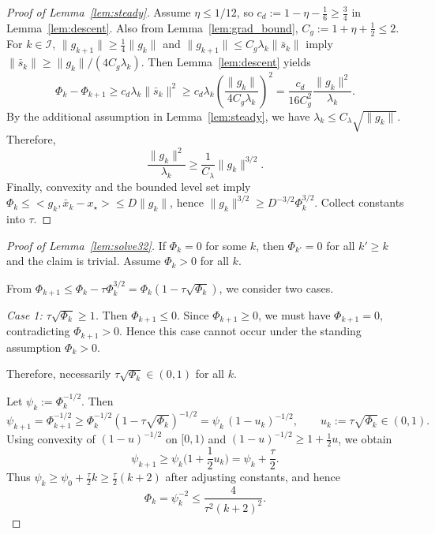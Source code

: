 \documentclass[11pt,a4paper]{article}
\def\ip#1#2{<#1,#2>}%
\newcommand{\ip}[2]{\left\langle #1,#2\right\rangle}
\begin{document}
\begin{proof}[Proof of Lemma~\ref{lem:steady}]
Assume $\eta\le 1/12$, so $c_d:=1-\eta-\frac16\ge \frac34$ in Lemma~\ref{lem:descent}.
Also from Lemma~\ref{lem:grad_bound}, $C_g:=1+\eta+\frac12\le 2$.
For $k\in\mathcal I$, $\|g_{k+1}\|\ge \frac14\|g_k\|$ and $\|g_{k+1}\|\le C_g\lambda_k\|\bar s_k\|$ imply
$\|\bar s_k\|\ge \|g_k\|/(4C_g\lambda_k)$.
Then Lemma~\ref{lem:descent} yields
\[
\Phi_k-\Phi_{k+1}\ge c_d\lambda_k\|\bar s_k\|^2
\ge c_d\lambda_k\left(\frac{\|g_k\|}{4C_g\lambda_k}\right)^2
=\frac{c_d}{16C_g^2}\frac{\|g_k\|^2}{\lambda_k}.
\]
By the additional assumption in Lemma~\ref{lem:steady}, we have $\lambda_k\le C_\lambda\sqrt{\|g_k\|}$.
Therefore,
\[
\frac{\|g_k\|^2}{\lambda_k}\ge \frac{1}{C_\lambda}\|g_k\|^{3/2}.
\]
Finally, convexity and the bounded level set imply $\Phi_k\le \ip{g_k}{\bar x_k-x_\star}\le D\|g_k\|$, hence
$\|g_k\|^{3/2}\ge D^{-3/2}\Phi_k^{3/2}$.
Collect constants into $\tau$.
\end{proof}

\begin{proof}[Proof of Lemma~\ref{lem:solve32}]
If $\Phi_k=0$ for some $k$, then $\Phi_{k'}=0$ for all $k'\ge k$ and the claim is trivial.
Assume $\Phi_k>0$ for all $k$.

From $\Phi_{k+1}\le \Phi_k-\tau \Phi_k^{3/2}=\Phi_k(1-\tau\sqrt{\Phi_k})$, we consider two cases.

\emph{Case 1: $\tau\sqrt{\Phi_k}\ge 1$.}
Then $\Phi_{k+1}\le 0$. Since $\Phi_{k+1}\ge 0$, we must have $\Phi_{k+1}=0$,
contradicting $\Phi_{k+1}>0$.
Hence this case cannot occur under the standing assumption $\Phi_k>0$.

Therefore, necessarily $\tau\sqrt{\Phi_k}\in(0,1)$ for all $k$.

Let $\psi_k:=\Phi_k^{-1/2}$. Then
\[
\psi_{k+1}=\Phi_{k+1}^{-1/2}\ge \Phi_k^{-1/2}(1-\tau\sqrt{\Phi_k})^{-1/2}
=\psi_k\,(1-u_k)^{-1/2},\qquad u_k:=\tau\sqrt{\Phi_k}\in(0,1).
\]
Using convexity of $(1-u)^{-1/2}$ on $[0,1)$ and $(1-u)^{-1/2}\ge 1+\frac12u$, we obtain
\[
\psi_{k+1}\ge \psi_k\Big(1+\frac12 u_k\Big)=\psi_k+\frac{\tau}{2}.
\]
Thus $\psi_k\ge \psi_0+\frac{\tau}{2}k\ge \frac{\tau}{2}(k+2)$ after adjusting constants, and hence
\[
\Phi_k=\psi_k^{-2}\le \frac{4}{\tau^2(k+2)^2}.
\]
\end{proof}
\end{document}
